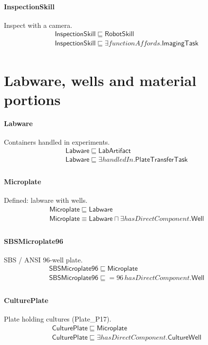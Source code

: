 \documentclass[10pt]{article}
\begin{document}
\paragraph{InspectionSkill} Inspect with a camera.
\[\begin{array}{l}
\mathsf{InspectionSkill} \sqsubseteq  \mathsf{RobotSkill} \\
\mathsf{InspectionSkill} \sqsubseteq  \exists \mathit{functionAffords}.\mathsf{ImagingTask} \\
\end{array}\]
\section*{Labware, wells and material portions}
\paragraph{Labware} Containers handled in experiments.
\[\begin{array}{l}
\mathsf{Labware} \sqsubseteq  \mathsf{LabArtifact} \\
\mathsf{Labware} \sqsubseteq  \exists \mathit{handledIn}.\mathsf{PlateTransferTask} \\
\end{array}\]
\paragraph{Microplate} Defined: labware with wells.
\[\begin{array}{l}
\mathsf{Microplate} \sqsubseteq  \mathsf{Labware} \\
\mathsf{Microplate} \equiv  \mathsf{Labware} \sqcap  \exists \mathit{hasDirectComponent}.\mathsf{Well} \\
\end{array}\]
\paragraph{SBSMicroplate96} SBS / ANSI 96-well plate.
\[\begin{array}{l}
\mathsf{SBSMicroplate96} \sqsubseteq  \mathsf{Microplate} \\
\mathsf{SBSMicroplate96} \sqsubseteq  {=}96\, \mathit{hasDirectComponent}.\mathsf{Well} \\
\end{array}\]
\paragraph{CulturePlate} Plate holding cultures (Plate\_P17).
\[\begin{array}{l}
\mathsf{CulturePlate} \sqsubseteq  \mathsf{Microplate} \\
\mathsf{CulturePlate} \sqsubseteq  \exists \mathit{hasDirectComponent}.\mathsf{CultureWell} \\
\end{array}\]
\end{document}
